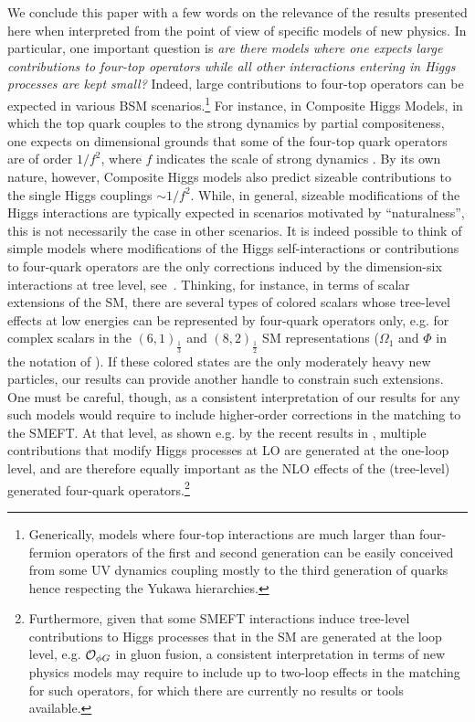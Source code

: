 We conclude this paper with a few words on the relevance of the results presented here when interpreted from the point of view of specific models of new physics. 
In particular, one important question is \textit{ are there models where one expects large contributions to four-top operators while all other interactions entering in Higgs processes are kept small?}
%
Indeed, large contributions to four-top operators can be expected in various BSM scenarios.\footnote{Generically, models where four-top interactions are much larger than four-fermion operators of the first and second generation can be easily conceived from some UV dynamics coupling mostly to the third generation of quarks hence respecting the Yukawa hierarchies.} For instance, in Composite Higgs Models, in which the top quark couples to the strong dynamics by partial compositeness, one expects on dimensional grounds that some of the four-top quark operators are of order $1/f^2$, where $f$ indicates the scale of strong dynamics \cite{Banelli:2020iau}. 
By its own nature, however, Composite Higgs models also predict sizeable contributions to the single Higgs couplings $\sim 1/f^2$. While, in general, sizeable modifications of the Higgs interactions are typically expected in scenarios motivated by ``naturalness'', this is not necessarily the case in other scenarios. 
It is indeed possible to think of simple models where modifications of the Higgs self-interactions or contributions to four-quark operators are the only corrections induced by the dimension-six interactions at tree level, see~\cite{deBlas:2017xtg}.
Thinking, for instance, in terms of scalar extensions of the SM, there are several types of colored scalars whose tree-level effects at low energies can be represented by four-quark operators only, e.g. for complex scalars in the $(6,1)_{\frac 1 3}$ and $(8,2)_{\frac 1 2}$ SM representations ($\Omega_1$ and $\Phi$ in the notation of \cite{deBlas:2017xtg}).  If these colored states are the only moderately heavy new particles, our results can provide another handle to constrain such extensions. 
One must be careful, though, as a consistent interpretation of our results for any such models would require to include higher-order corrections in the matching to the SMEFT. At that level, as shown e.g. by the recent results in \cite{Anisha:2021hgc}, multiple contributions that modify Higgs processes at LO are generated at the one-loop level, and are therefore equally important as the NLO effects of the (tree-level) generated four-quark operators.\footnote{Furthermore, given that some SMEFT interactions induce tree-level contributions to Higgs processes that in the SM are generated at the loop level, e.g. ${\cal O}_{\phi G}$ in gluon fusion, a consistent interpretation in terms of new physics models may require to include up to two-loop effects in the matching for such operators, for which there are currently no results or tools available.}
